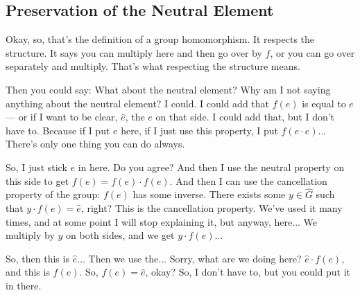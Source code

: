 \subsection{Preservation of the Neutral Element}

\begin{speech}[00:09:02 - 00:10:40]
Okay, so, that's the definition of a group homomorphism. It respects the structure. It says you can multiply here and then go over by $f$, or you can go over separately and multiply. That's what respecting the structure means.

Then you could say: What about the neutral element? Why am I not saying anything about the neutral element? I could. I could add that $f(e)$ is equal to $e$  --- or if I want to be clear, $\hat{e}$, the $e$ on that side. I could add that, but I don't have to. Because if I put $e$ here, if I just use this property, I put $f(e \cdot e)$...  There's only one thing you can do always.

So, I just stick $e$ in here. Do you agree? And then I use the neutral property on this side to get $f(e) = f(e) \cdot f(e)$.  And then I can use the cancellation property of the group: $f(e)$ has some inverse. There exists some $y \in \hat{G}$ such that $y \cdot f(e) = \hat{e}$,  right? This is the cancellation property. We've used it many times, and at some point I will stop explaining it, but anyway, here... We multiply by $y$ on both sides, and we get $y \cdot f(e)\dots$ 

So, then this is $\hat{e} \dots$  Then we use the... Sorry, what are we doing here?  $\hat{e} \cdot f(e)$, and this is $f(e)$.  So, $f(e) = \hat{e}$, okay? So, I don't have to, but you could put it in there.
\end{speech}


